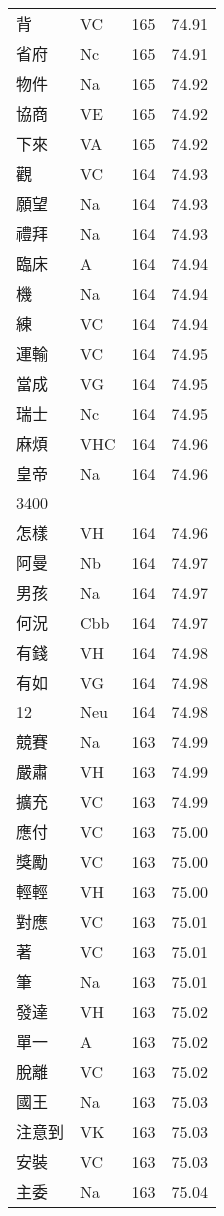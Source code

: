 \documentclass[twocolumn]{book}
\begin{document}
\begin{supertabular}{llrr}
背 & VC & 165 &  74.91\\
省府 & Nc & 165 &  74.91\\
物件 & Na & 165 &  74.92\\
協商 & VE & 165 &  74.92\\
下來 & VA & 165 &  74.92\\
觀 & VC & 164 &  74.93\\
願望 & Na & 164 &  74.93\\
禮拜 & Na & 164 &  74.93\\
臨床 & A & 164 &  74.94\\
機 & Na & 164 &  74.94\\
練 & VC & 164 &  74.94\\
運輸 & VC & 164 &  74.95\\
當成 & VG & 164 &  74.95\\
瑞士 & Nc & 164 &  74.95\\
麻煩 & VHC & 164 &  74.96\\
皇帝 & Na & 164 &  74.96\\
3400\\
怎樣 & VH & 164 &  74.96\\
阿曼 & Nb & 164 &  74.97\\
男孩 & Na & 164 &  74.97\\
何況 & Cbb & 164 &  74.97\\
有錢 & VH & 164 &  74.98\\
有如 & VG & 164 &  74.98\\
12 & Neu & 164 &  74.98\\
競賽 & Na & 163 &  74.99\\
嚴肅 & VH & 163 &  74.99\\
擴充 & VC & 163 &  74.99\\
應付 & VC & 163 &  75.00\\
獎勵 & VC & 163 &  75.00\\
輕輕 & VH & 163 &  75.00\\
對應 & VC & 163 &  75.01\\
著 & VC & 163 &  75.01\\
筆 & Na & 163 &  75.01\\
發達 & VH & 163 &  75.02\\
單一 & A & 163 &  75.02\\
脫離 & VC & 163 &  75.02\\
國王 & Na & 163 &  75.03\\
注意到 & VK & 163 &  75.03\\
安裝 & VC & 163 &  75.03\\
主委 & Na & 163 &  75.04\\

\end{supertabular}
\end{document}
